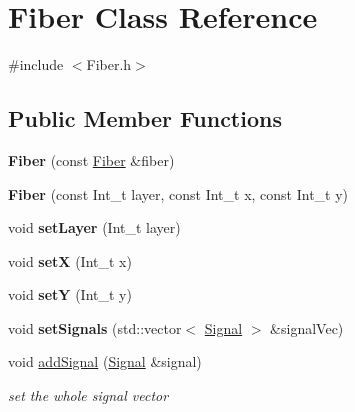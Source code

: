 \hypertarget{classFiber}{}\section{Fiber Class Reference}
\label{classFiber}


{\ttfamily \#include $<$Fiber.\+h$>$}

\subsection*{Public Member Functions}
\begin{DoxyCompactItemize}
\item 
\mbox{\label{classFiber_ad2e469dbbb1c7ff0d08d8a451fe099da}} 
{\bfseries Fiber} (const \hyperlink{classFiber}{Fiber} \&fiber)
\item 
\mbox{\label{classFiber_a82dec1d501c2bea3254d1e349e968a39}} 
{\bfseries Fiber} (const Int\+\_\+t layer, const Int\+\_\+t x, const Int\+\_\+t y)
\item 
\mbox{\label{classFiber_aeed749f11255081384ec0f41793aa5de}} 
void {\bfseries set\+Layer} (Int\+\_\+t layer)
\item 
\mbox{\label{classFiber_a14500d45eb679b65ee279118f1d9d585}} 
void {\bfseries setX} (Int\+\_\+t x)
\item 
\mbox{\label{classFiber_ab078183870faf03ae064c3442522f702}} 
void {\bfseries setY} (Int\+\_\+t y)
\item 
\mbox{\label{classFiber_ad83c22a082f0d2b103d913b32f93502a}} 
void {\bfseries set\+Signals} (std\+::vector$<$ \hyperlink{classSignal}{Signal} $>$ \&signal\+Vec)
\item 
\mbox{\label{classFiber_a14a37fbb8726d146ee92c34ca6d66a76}} 
void \hyperlink{classFiber_a14a37fbb8726d146ee92c34ca6d66a76}{add\+Signal} (\hyperlink{classSignal}{Signal} \&signal)
\begin{DoxyCompactList}\small\item\em set the whole signal vector \end{DoxyCompactList}\item 
\mbox{\label{classFiber_a1412d08cdfbf76a52d110638a044008c}} 

\end{DoxyCompactItemize}
